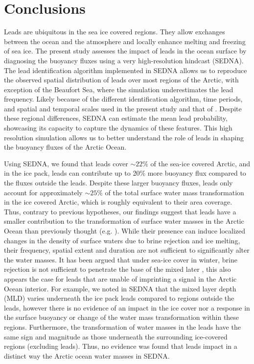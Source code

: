\documentclass[lineno,sn-basic]{sn-jnl}%
\begin{document}
\section{Conclusions}

Leads are ubiquitous in the sea ice covered regions. They allow exchanges between the ocean and the atmosphere and locally enhance melting and freezing of sea ice. The present study assesses the impact of leads in the ocean surface by diagnosing the buoyancy fluxes using a very high-resolution hindcast (SEDNA). The lead identification algorithm implemented in SEDNA allows us to reproduce the observed spatial distribution of leads over most regions of the Arctic, with exception of the Beaufort Sea, where the simulation underestimates the lead frequency. Likely because of the different identification algorithm, time periods, and spatial and temporal scales used in the present study and that of \citealp{Willmes_leads_currents_2023}. Despite these regional differences, SEDNA can estimate the mean lead probability, showcasing its capacity to capture the dynamics of these features. This high resolution simulation allows us to better understand the role of leads in shaping the buoyancy fluxes of the Arctic Ocean.

Using SEDNA, we found that leads cover $\sim 22\%$ of the sea-ice covered Arctic, and in the ice pack, leads can contribute up to 20\% more buoyancy flux compared to the fluxes outside the leads. Despite these larger buoyancy fluxes, leads only account for approximately $\sim 25\%$ of the total surface water mass transformation in the ice covered Arctic, which is roughly equivalent to their area coverage. Thus, contrary to previous hypotheses, our findings suggest that leads have a smaller contribution to the transformation of surface water masses in the Arctic Ocean than previously thought (e.g. \citealp{Hutter_identification_2019, McPhee_LKF_2005}). While their presence can induce localized changes in the density of surface waters due to brine rejection and ice melting, their frequency, spatial extent and duration are not sufficient to significantly alter the water masses. It has been argued that under sea-ice cover in winter, brine rejection is not sufficient to penetrate the base of the mixed later \citep{Lenn_mixing_2022}, this also appears the case for leads that are unable of imprinting a signal in the Arctic Ocean interior. For example, we noted in SEDNA that the mixed layer depth (MLD) varies underneath the ice pack leads compared to regions outside the leads, however there is no evidence of an impact in the ice cover nor a response in the surface buoyancy or change of the water mass transformation within these regions. Furthermore, the transformation of water masses in the leads have the same sign and magnitude as those underneath the surrounding ice-covered regions (excluding leads). Thus, no evidence was found that leads impact in a distinct way the Arctic ocean water masses in SEDNA.
\end{document}
